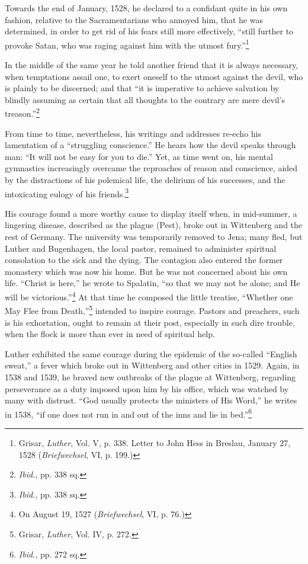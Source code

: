 Towards the end of January, 1528, he declared to a confidant quite
in his own fashion, relative to the Sacramentarians who annoyed him,
that he was determined, in order to get rid of his fears still more
effectively, “still further to provoke Satan, who was raging against
him with the utmost fury.”\footnote
{Grisar, \textit{Luther}, Vol. V, p. 338. Letter to John Hess in Breslau, January 27, 1528
(\textit{Briefwechsel}, VI, p. 199.)}

In the middle of the same year he told another friend that it is
always necessary, when temptations assail one, to exert oneself to the
utmost against the devil, who is plainly to be discerned; and that
“it is imperative to achieve salvation by blindly assuming as certain
that all thoughts to the contrary are mere devil’s treason.”\footnote{\textit{Ibid.}, pp. 338 sq.}

From time to time, nevertheless, his writings and addresses re-echo
his lamentation of a “struggling conscience.” He hears how the devil
speaks through man: “It will not be easy for you to die.” Yet, as
time went on, his mental gymnastics increasingly overcame the reproaches
of reason and conscience, aided by the distractions of his
polemical life, the delirium of his successes, and the intoxicating
eulogy of his friends.\footnote{\textit{Ibid.}, pp. 338 sq.}

His courage found a more worthy cause to display itself when, in
mid-summer, a lingering disease, described as the plague (Pest), broke
out in Wittenberg and the rest of Germany. The university was
temporarily removed to Jena; many fled, but Luther and Bugenhagen,
the local pastor, remained to administer spiritual consolation
to the sick and the dying. The contagion also entered the former
monastery which was now his home. But he was not concerned about his own life.
“Christ is here,” he wrote to Spalatin, “so that we may not be alone; and He
will be victorious.”\footnote{On August 19, 1527 (\textit{Briefwechsel}, VI, p.
76.)} At that time he composed the little treatise, “Whether one May Flee from
Death,”\footnote{Grisar, \textit{Luther}, Vol. IV, p. 272.}
intended to inspire courage. Pastors and preachers, such is his exhortation,
ought to remain at their post, especially in such dire
trouble, when the flock is more than ever in need of spiritual help.

Luther exhibited the same courage during the epidemic of the so-called
“English sweat,” a fever which broke out in Wittenberg and
other cities in 1529. Again, in 1538 and 1539, he braved new outbreaks
of the plague at Wittenberg, regarding perseverance as a duty
imposed upon him by his office, which was watched by many with distrust.
“God usually protects the ministers of His Word,” he writes in
1538, “if one does not run in and out of the inns and lie in bed.”\footnote{\textit{Ibid.}, pp. 272 sq.}

